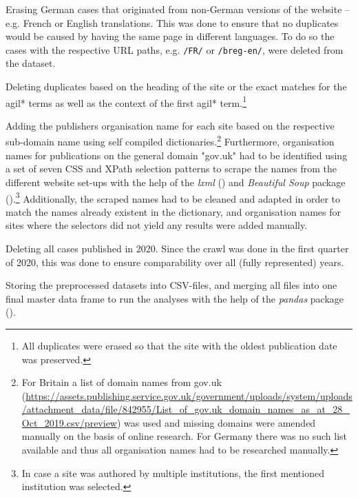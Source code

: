 \begin{compactitem}
\begin{compactitem}
    \end{compactitem}
\item Erasing German cases that originated from non-German versions of the website – e.g. French or English translations. This was done to ensure that no duplicates would be caused by having the same page in different languages. To do so the cases with the respective URL paths, e.g. \texttt{/FR/} or \texttt{/breg-en/}, were deleted from the dataset.
\item Deleting duplicates based on the heading of the site or the exact matches for the agil* terms as well as the context of the first agil* term.\footnote{All duplicates were erased so that the site with the oldest publication date was preserved.}
\item Adding the publishers organisation name for each site based on the respective sub-domain name using self compiled dictionaries.\footnote{For Britain a list of domain names from gov.uk (\url{https://assets.publishing.service.gov.uk/government/uploads/system/uploads/attachment_data/file/842955/List_of_gov.uk_domain_names_as_at_28_Oct_2019.csv/preview}) was used and missing domains were amended manually on the basis of online research. For Germany there was no such list available and thus all organisation names had to be researched manually.} Furthermore, organisation names for publications on the general domain "gov.uk" had to be identified using a set of seven CSS and XPath selection patterns to scrape the names from the different website set-ups with the help of the \textit{lxml} (\cite{Faassen2006}) and \textit{Beautiful Soup} package (\cite{Richardson2007}).\footnote{In case a site was authored by multiple institutions, the first mentioned institution was selected.} Additionally, the scraped names had to be cleaned and adapted in order to match the names already existent in the dictionary, and organisation names for sites where the selectors did not yield any results were added manually. 
\item Deleting all cases published in 2020. Since the crawl was done in the first quarter of 2020, this was done to ensure comparability over all (fully represented) years.
\item Storing the preprocessed datasets into CSV-files, and merging all files into one final master data frame to run the analyses with the help of the \textit{pandas} package (\cite{McKinney2010}). 
\end{compactitem}

